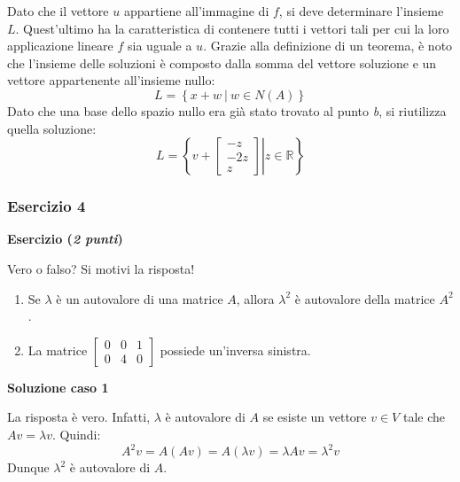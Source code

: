 \documentclass[a4paper]{article}
\begin{document}
	Dato che il vettore $u$ appartiene all'immagine di $f$, si deve determinare l'insieme $L$. Quest'ultimo ha la caratteristica di contenere tutti i vettori tali per cui la loro applicazione lineare $f$ sia uguale a $u$. Grazie alla definizione di un teorema, è noto che l'insieme delle soluzioni è composto dalla somma del vettore soluzione e un vettore appartenente all'insieme nullo:
	\begin{equation*}
		L = \left\{x + w \: | \: w \in N\left(A\right)\right\}
	\end{equation*}
	Dato che una base dello spazio nullo era già stato trovato al punto \emph{b}, si riutilizza quella soluzione:
	\begin{equation*}
		L = \left\{\left. v + \begin{bmatrix}
			-z \\
			-2z \\
			z
		\end{bmatrix} \right| z \in \mathbb{R}\right\}
	\end{equation*}\newpage

	\subsubsection{Esercizio 4}
	
	\textcolor{Red3}{\textbf{Esercizio (\emph{2 punti})}}\newline
	
	\noindent
	Vero o falso? Si motivi la risposta!
	
	\begin{enumerate}
		\item Se $\lambda$ è un autovalore di una matrice $A$, allora $\lambda^{2}$ è autovalore della matrice $A^{2}$.
		
		\item La matrice $\begin{bmatrix}
				0 & 0 & 1 \\
				0 & 4 & 0
			\end{bmatrix}$ possiede un'inversa sinistra.
	\end{enumerate}
	
	\noindent
	\textcolor{Green4}{\textbf{Soluzione caso 1}}\newline
	
	\noindent
	La risposta è vero. Infatti, $\lambda$ è autovalore di $A$ se esiste un vettore $v \in V$ tale che $Av = \lambda v$. Quindi:
	\begin{equation*}
		A^{2}v = A\left(Av\right) = A\left(\lambda v\right) = \lambda{Av} = \lambda^{2}v
	\end{equation*}
	Dunque $\lambda^{2}$ è autovalore di $A$.\newline
	
\end{document}
